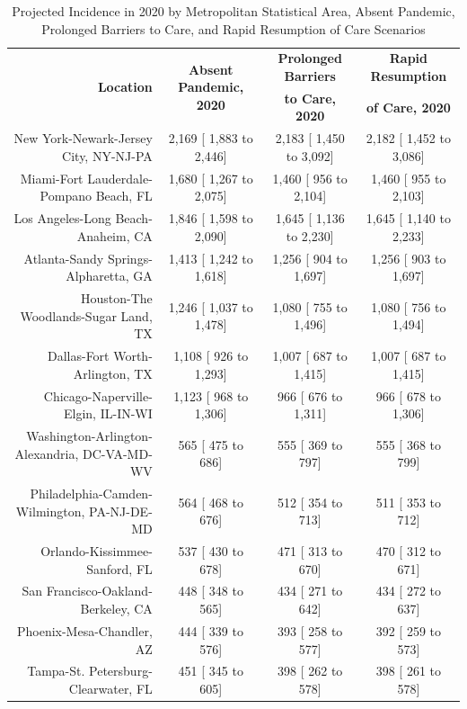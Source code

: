 \documentclass{article}
\begin{document}
\begin{table}[H]
	\caption{Projected Incidence in 2020 by Metropolitan Statistical Area, Absent Pandemic, Prolonged Barriers to Care, and Rapid Resumption of Care Scenarios}
	\footnotesize
	\begin{tabular}{|r|c|c|c|}
		\hline
		\multirow{2}{*}{\textbf{Location}} & \multirow{2}{*}{\textbf{Absent Pandemic, 2020}} & \textbf{Prolonged Barriers} & \textbf{Rapid Resumption}\\
		&  & \textbf{to Care, 2020} & \textbf{of Care, 2020}\\
		\hline\hline
		New York-Newark-Jersey City, NY-NJ-PA &  2,169 [ 1,883 to  2,446] &  2,183 [ 1,450 to  3,092] &  2,182 [ 1,452 to  3,086]\\
		Miami-Fort Lauderdale-Pompano Beach, FL &  1,680 [ 1,267 to  2,075] &  1,460 [   956 to  2,104] &  1,460 [   955 to  2,103]\\
		Los Angeles-Long Beach-Anaheim, CA &  1,846 [ 1,598 to  2,090] &  1,645 [ 1,136 to  2,230] &  1,645 [ 1,140 to  2,233]\\
		Atlanta-Sandy Springs-Alpharetta, GA &  1,413 [ 1,242 to  1,618] &  1,256 [   904 to  1,697] &  1,256 [   903 to  1,697]\\
		Houston-The Woodlands-Sugar Land, TX &  1,246 [ 1,037 to  1,478] &  1,080 [   755 to  1,496] &  1,080 [   756 to  1,494]\\
		Dallas-Fort Worth-Arlington, TX &  1,108 [   926 to  1,293] &  1,007 [   687 to  1,415] &  1,007 [   687 to  1,415]\\
		Chicago-Naperville-Elgin, IL-IN-WI &  1,123 [   968 to  1,306] &    966 [   676 to  1,311] &    966 [   678 to  1,306]\\
		Washington-Arlington-Alexandria, DC-VA-MD-WV &    565 [   475 to    686] &    555 [   369 to    797] &    555 [   368 to    799]\\
		Philadelphia-Camden-Wilmington, PA-NJ-DE-MD &    564 [   468 to    676] &    512 [   354 to    713] &    511 [   353 to    712]\\
		Orlando-Kissimmee-Sanford, FL &    537 [   430 to    678] &    471 [   313 to    670] &    470 [   312 to    671]\\
		San Francisco-Oakland-Berkeley, CA &    448 [   348 to    565] &    434 [   271 to    642] &    434 [   272 to    637]\\
		Phoenix-Mesa-Chandler, AZ &    444 [   339 to    576] &    393 [   258 to    577] &    392 [   259 to    573]\\
		Tampa-St. Petersburg-Clearwater, FL &    451 [   345 to    605] &    398 [   262 to    578] &    398 [   261 to    578]\\

\end{tabular}
\end{table}
\end{document}
